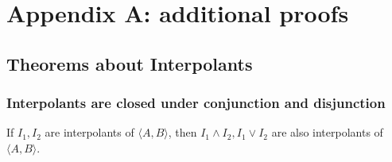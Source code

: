 \chapter*{Appendix A: additional proofs}


\section{Theorems about Interpolants}

\subsection{Interpolants are closed under conjunction and disjunction}

\begin{theorem}
  If $I_1, I_2$ are interpolants of $\langle A, B \rangle$, then 
  $I_1 \land I_2, I_1 \lor I_2$ are also interpolants of $\langle A, B \rangle$.
\end{theorem}

